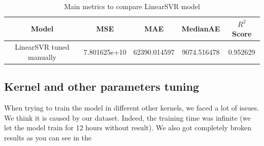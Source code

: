 \begin{table}[h]
    \centering
    \begin{tabular}{ccccc}
        \toprule
        Model &  MSE &  MAE & MedianAE & $R^2$ Score \\
        \midrule
        LinearSVR tuned manually & 7.801625e+10 & 62390.014597 & 9074.516478 & 0.952629\\
        \bottomrule
    \end{tabular}
    \caption{Main metrics to compare LinearSVR model}
\end{table}

\subsection{Kernel and other parameters tuning}
When trying to train the model in different other kernels, we faced a lot of issues. We think it is caused by our dataset. Indeed, the training time was infinite (we let the model train for 12 hours without result). We also got completely broken results as you can see in the \href{https://github.com/pierre-jezegou/fib-ml-project/blob/main/models/svm.ipynb}{}